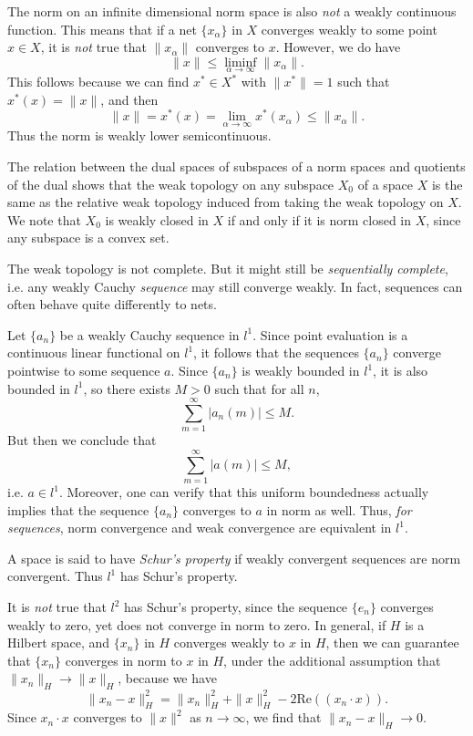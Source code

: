 The norm on an infinite dimensional norm space is also \emph{not} a weakly continuous function. This means that if a net $\{ x_\alpha \}$ in $X$ converges weakly to some point $x \in X$, it is \emph{not} true that $\| x_\alpha \|$ converges to $x$. However, we do have
%
\[ \| x \| \leq \liminf_{\alpha \to \infty} \| x_\alpha \|. \]
%
This follows because we can find $x^* \in X^*$ with $\| x^* \| = 1$ such that $x^*(x) = \| x \|$, and then
%
\[ \| x \| = x^*(x) = \lim_{\alpha \to \infty} x^*(x_\alpha) \leq \| x_\alpha \|. \]
%
Thus the norm is weakly lower semicontinuous.

The relation between the dual spaces of subspaces of a norm spaces and quotients of the dual shows that the weak topology on any subspace $X_0$ of a space $X$ is the same as the relative weak topology induced from taking the weak topology on $X$. We note that $X_0$ is weakly closed in $X$ if and only if it is norm closed in $X$, since any subspace is a convex set.

The weak topology is not complete. But it might still be \emph{sequentially complete}, i.e. any weakly Cauchy \emph{sequence} may still converge weakly. In fact, sequences can often behave quite differently to nets.

\begin{example}
    Let $\{ a_n \}$ be a weakly Cauchy sequence in $l^1$. Since point evaluation is a continuous linear functional on $l^1$, it follows that the sequences $\{ a_n \}$ converge pointwise to some sequence $a$. Since $\{ a_n \}$ is weakly bounded in $l^1$, it is also bounded in $l^1$, so there exists $M > 0$ such that for all $n$,
    \[ \sum_{m = 1}^\infty |a_n(m)| \leq M. \]
    But then we conclude that
    \[ \sum_{m = 1}^\infty |a(m)| \leq M, \]
    i.e. $a \in l^1$. Moreover, one can verify that this uniform boundedness actually implies that the sequence $\{ a_n \}$ converges to $a$ in norm as well. Thus, \emph{for sequences}, norm convergence and weak convergence are equivalent in $l^1$.
\end{example}

A space is said to have \emph{Schur's property} if weakly convergent sequences are norm convergent. Thus $l^1$ has Schur's property.

\begin{example}
    It is \emph{not} true that $l^2$ has Schur's property, since the sequence $\{ e_n \}$ converges weakly to zero, yet does not converge in norm to zero. In general, if $H$ is a Hilbert space, and $\{ x_n \}$ in $H$ converges weakly to $x$ in $H$, then we can guarantee that $\{ x_n \}$ converges in norm to $x$ in $H$, under the additional assumption that $\| x_n \|_H \to \| x \|_H$, because we have
    \[ \| x_n - x \|_H^2 = \| x_n \|^2_H + \| x \|^2_H - 2 \text{Re}( (x_n \cdot x) ). \]
    Since $x_n \cdot x$ converges to $\| x \|^2$ as $n \to \infty$, we find that $\| x_n - x \|_H \to 0$.
\end{example}

